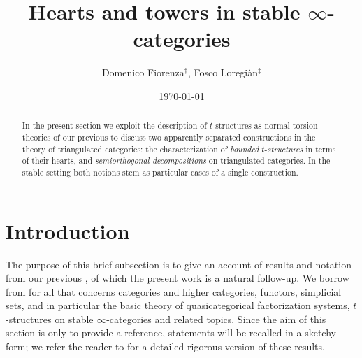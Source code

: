 \documentclass[a4paper,12pt]{amsart}
\begin{document}
\title{Hearts and towers in stable $\infty$-categories}
\author{Domenico Fiorenza$^\dag$, Fosco Loregi\`an$^\ddag$}
	\address{%
	\textsf{Domenico Fiorenza}: 
	Dipartimento di Matematica ``Guido Castelnuovo'', 
	Universit\`a degli Studi di Roma ``la Sapienza'',	
	P.le Aldo Moro 2 --  -- Roma. 
	}


\date{\today}
\maketitle 

\begin{abstract}
In the present section we exploit the description of $t$-structures as normal torsion theories of our previous \cite{Fiorenza2014} to discuss two apparently separated constructions in the theory of triangulated categories: the characterization of \emph{bounded} $t$-\emph{structures} in terms of their hearts, and \emph{semiorthogonal decompositions} on triangulated categories. In the stable setting both notions stem as particular cases of a single construction. 
\end{abstract}
\section*{Introduction}
The purpose of this brief subsection is to give an account of results and notation from our previous \cite{Fiorenza2014}, of which the present work is a natural follow-up. We borrow from \cite{Fiorenza2014} for all that concerns categories and higher categories, functors, simplicial sets, and in particular the basic theory of quasicategorical factorization systems, $t$-structures on stable $\infty$-categories and related topics. Since the aim of this section is only to provide a reference, statements will be recalled in a sketchy form; we refer the reader to \cite{Fiorenza2014} for a detailed rigorous version of these results.
\end{document}
